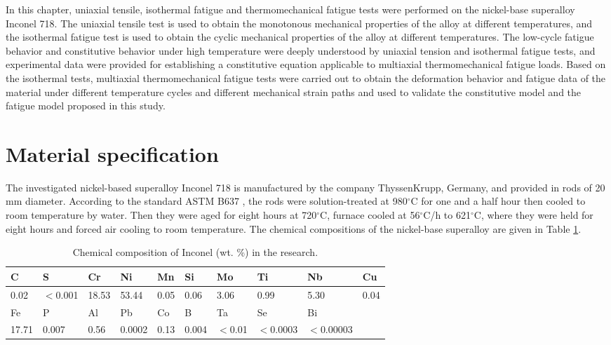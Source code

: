 In this chapter, uniaxial tensile, isothermal fatigue and thermomechanical fatigue tests were performed on the nickel-base superalloy Inconel 718. The uniaxial tensile test is used to obtain the monotonous mechanical properties of the alloy at different temperatures, and the isothermal fatigue test is used to obtain the cyclic mechanical properties of the alloy at different temperatures. The low-cycle fatigue behavior and constitutive behavior under high temperature were deeply understood by uniaxial tension and isothermal fatigue tests, and experimental data were provided for establishing a constitutive equation applicable to multiaxial thermomechanical fatigue loads. Based on the isothermal tests, multiaxial thermomechanical fatigue tests were carried out to obtain the deformation behavior and fatigue data of the material under different temperature cycles and different mechanical strain paths and used to validate the constitutive model and the fatigue model proposed in this study.

\section{Material specification}
\noindent
The investigated nickel-based superalloy Inconel 718 is manufactured by the company ThyssenKrupp, Germany, and provided in rods of 20 mm diameter. According to the standard ASTM B637 \cite{ASTMB63716}, the rods were solution-treated at 980$^{\circ}$C for one and a half hour then cooled to room temperature by water. Then they were aged for eight hours at 720$^{\circ}$C, furnace cooled at 56$^{\circ}$C/h to 621$^{\circ}$C, where they were held for eight hours and forced air cooling to room temperature.
The chemical compositions of the nickel-base superalloy are given in Table \ref{Tab:ChemicalCompositionofIN718}.

\begin{table}[htbp]
  \centering
  \caption{Chemical composition of Inconel (wt. \%) in the research.}
    \begin{tabular}{llllllllll}
    \toprule
    C     & S     & Cr    & Ni    & Mn    & Si    & Mo    & Ti    & Nb    & Cu \\
    \midrule
    0.02  & $<$0.001 & 18.53 & 53.44 & 0.05  & 0.06  & 3.06  & 0.99  & 5.30  & 0.04 \\
    \midrule
    Fe    & P     & Al    & Pb    & Co    & B     & Ta    & Se    & Bi    &  \\
    \midrule
    17.71 & 0.007 & 0.56  & 0.0002 & 0.13  & 0.004 & $<$0.01 & $<$0.0003 & $<$0.00003 &  \\
    \bottomrule
    \end{tabular}%
  \label{Tab:ChemicalCompositionofIN718}%
\end{table}%

